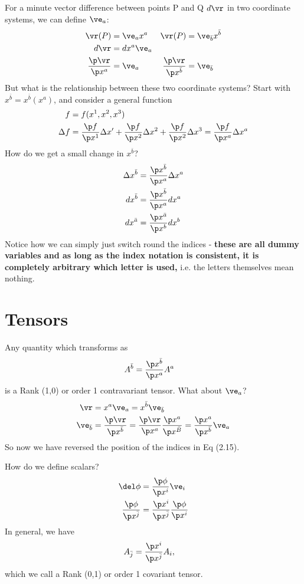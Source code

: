 \documentclass[a4paper, 11pt, normalem]{report}
\begin{document}
For a minute vector difference between points P and Q $d\vr$ in two coordinate systems, we can define $\ve_a$:
\begin{align}
    \vr(P) &= \ve_ax^a & \vr(P) &= \ve_{\bar{b}}x^{\bar{b}} \\
    d\vr &= dx^a\ve_a  \\
    \frac{\p\vr}{\p x^a} &= \ve_a & \frac{\p\vr}{\p x^{\bar{b}}} &= \ve_{\bar{b}}
\end{align}
But what is the relationship between these two coordinate systems?
Start with $x^{\bar{b}}=x^{\bar{b}}(x^a)$, and consider a general function
\begin{align}
    f &= f(x^1,x^2,x^3) \\
    \Delta f &= \frac{\p f}{\p x^1}\Delta x' + \frac{\p f}{\p x^2}\Delta x^2 + \frac{\p f}{\p x^2}\Delta x^3 = \frac{\p f}{\p x^a}\Delta x^a
\end{align}
How do we get a small change in $x^{\bar{b}}$?
\begin{align}
    \Delta x^{\bar{b}} &= \frac{\p x^{\bar{b}}}{\p x^{a}}\Delta x^{a} \\
    dx^{\bar{b}} &= \frac{\p x^{\bar{b}}}{\p x^a}dx^a \\
    dx^{\bar{a}} &= \frac{\p x^{\bar{a}}}{\p x^b}dx^b
\end{align}
Notice how we can simply just switch round the indices - \textbf{these are all dummy variables and as long as the index notation is consistent, it is completely arbitrary which letter is used,} i.e. the letters themselves mean nothing.

\section{Tensors}
Any quantity which transforms as
\begin{align}
    A^{\bar{b}} &= \frac{\p x^{\bar{b}}}{\p x^a}A^a
\end{align}
is a Rank (1,0) or order 1 contravariant tensor.
What about $\ve_a$?
\begin{align}
    \vr &= x^a\ve_a = x^{\bar{b}}\ve_{\bar{b}} \\
    \ve_{\bar{b}} &= \frac{\p\vr}{\p x^{\bar{b}}} = \frac{\p\vr}{\p x^a} \frac{\p x^a}{\p x^{\bar{B}}} = \frac{\p x^a}{\p x^{\bar{b}}}\ve_a
\end{align}
So now we have reversed the position of the indices in Eq (2.15).

How do we define scalars?
\begin{align}
    \del\phi &= \frac{\p\phi}{\p x^i}\ve_i \\
    \frac{\p\phi}{\p x^{\bar{j}}} &= \frac{\p x^i}{\p x^{\bar{j}}}\frac{\p\phi}{\p x^i}
\end{align}
In general, we have
\begin{align}
    A_{\bar{j}} &= \frac{\p x^i}{\p x^{\bar{j}}}A_i,
\end{align}
which we call a Rank (0,1) or order 1 covariant tensor.
\end{document}

